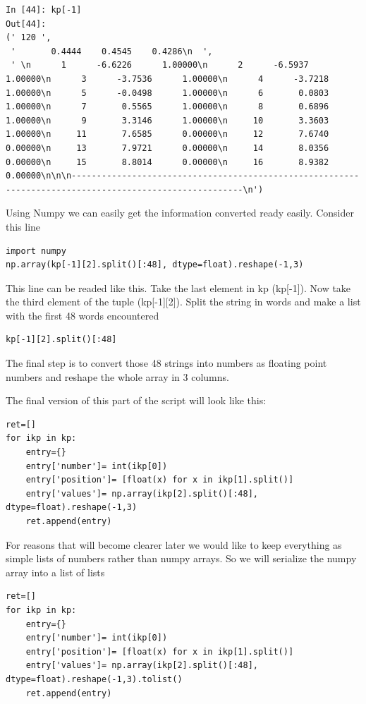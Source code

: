 \begin{lstlisting}
In [44]: kp[-1]
Out[44]: 
(' 120 ',
 '       0.4444    0.4545    0.4286\n  ',
 ' \n      1      -6.6226      1.00000\n      2      -6.5937      1.00000\n      3      -3.7536      1.00000\n      4      -3.7218      1.00000\n      5      -0.0498      1.00000\n      6       0.0803      1.00000\n      7       0.5565      1.00000\n      8       0.6896      1.00000\n      9       3.3146      1.00000\n     10       3.3603      1.00000\n     11       7.6585      0.00000\n     12       7.6740      0.00000\n     13       7.9721      0.00000\n     14       8.0356      0.00000\n     15       8.8014      0.00000\n     16       8.9382      0.00000\n\n\n--------------------------------------------------------------------------------------------------------\n')
\end{lstlisting}

Using Numpy we can easily get the information converted ready easily. Consider this line

\begin{lstlisting}
import numpy
np.array(kp[-1][2].split()[:48], dtype=float).reshape(-1,3)
\end{lstlisting}

This line can be readed like this. Take the last element in kp (kp[-1]). Now take the third element of the tuple (kp[-1][2]). Split the string in words and make a list with the first 48 words encountered

\begin{lstlisting}
kp[-1][2].split()[:48]
\end{lstlisting}

The final step is to convert those 48 strings into numbers as floating point numbers and reshape the whole array in 3 columns.

The final version of this part of the script will look like this:

\begin{lstlisting}
ret=[]
for ikp in kp:
    entry={}
    entry['number']= int(ikp[0])
    entry['position']= [float(x) for x in ikp[1].split()]
    entry['values']= np.array(ikp[2].split()[:48], dtype=float).reshape(-1,3)
    ret.append(entry)
\end{lstlisting}

For reasons that will become clearer later we would like to keep everything as simple lists of numbers rather than numpy arrays. So we will serialize the numpy array into a list of lists

\begin{lstlisting}
ret=[]
for ikp in kp:
    entry={}
    entry['number']= int(ikp[0])
    entry['position']= [float(x) for x in ikp[1].split()]
    entry['values']= np.array(ikp[2].split()[:48], dtype=float).reshape(-1,3).tolist()
    ret.append(entry)
\end{lstlisting}

